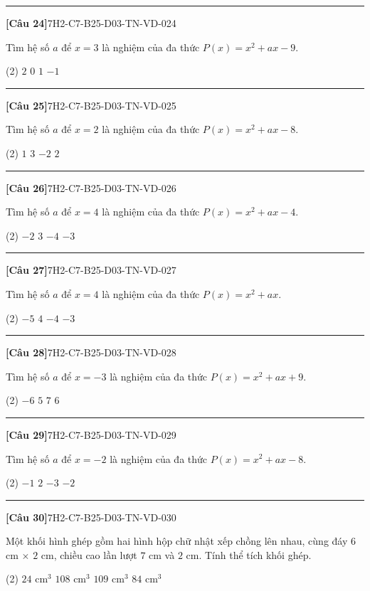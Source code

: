 \documentclass[12pt,a4paper]{article}
\newif\ifloigiai
\newenvironment{cauhoi}[2]{%
  \par\medskip\noindent\rule{\textwidth}{0.4pt}\par\nopagebreak
  \noindent\textbf{[#1]}\hfill{\scriptsize\ttfamily #2}\par\nopagebreak\smallskip}{\par}
\newcommand{\dapan}[1]{\ifloigiai\par\smallskip\noindent\textit{Đáp án:} \textbf{#1}\par\fi}
\begin{document}
\begin{cauhoi}{Câu 24}{7H2-C7-B25-D03-TN-VD-024}
Tìm hệ số $a$ để $x=3$ là nghiệm của đa thức $P(x)=x^{2}+ax-9$.
\begin{tasks}(2)
\task $2$
\task $0$
\task $1$
\task $-1$
\end{tasks}
\dapan{B}
\end{cauhoi}
\begin{cauhoi}{Câu 25}{7H2-C7-B25-D03-TN-VD-025}
Tìm hệ số $a$ để $x=2$ là nghiệm của đa thức $P(x)=x^{2}+ax-8$.
\begin{tasks}(2)
\task $1$
\task $3$
\task $-2$
\task $2$
\end{tasks}
\dapan{D}
\end{cauhoi}
\begin{cauhoi}{Câu 26}{7H2-C7-B25-D03-TN-VD-026}
Tìm hệ số $a$ để $x=4$ là nghiệm của đa thức $P(x)=x^{2}+ax-4$.
\begin{tasks}(2)
\task $-2$
\task $3$
\task $-4$
\task $-3$
\end{tasks}
\dapan{D}
\end{cauhoi}
\begin{cauhoi}{Câu 27}{7H2-C7-B25-D03-TN-VD-027}
Tìm hệ số $a$ để $x=4$ là nghiệm của đa thức $P(x)=x^{2}+ax$.
\begin{tasks}(2)
\task $-5$
\task $4$
\task $-4$
\task $-3$
\end{tasks}
\dapan{C}
\end{cauhoi}
\begin{cauhoi}{Câu 28}{7H2-C7-B25-D03-TN-VD-028}
Tìm hệ số $a$ để $x=-3$ là nghiệm của đa thức $P(x)=x^{2}+ax+9$.
\begin{tasks}(2)
\task $-6$
\task $5$
\task $7$
\task $6$
\end{tasks}
\dapan{D}
\end{cauhoi}
\begin{cauhoi}{Câu 29}{7H2-C7-B25-D03-TN-VD-029}
Tìm hệ số $a$ để $x=-2$ là nghiệm của đa thức $P(x)=x^{2}+ax-8$.
\begin{tasks}(2)
\task $-1$
\task $2$
\task $-3$
\task $-2$
\end{tasks}
\dapan{D}
\end{cauhoi}
\begin{cauhoi}{Câu 30}{7H2-C7-B25-D03-TN-VD-030}
Một khối hình ghép gồm hai hình hộp chữ nhật xếp chồng lên nhau, cùng đáy $6$ cm $\times$ $2$ cm, chiều cao lần lượt $7$ cm và $2$ cm. Tính thể tích khối ghép.
\begin{tasks}(2)
\task $24\text{ cm}^3$
\task $108\text{ cm}^3$
\task $109\text{ cm}^3$
\task $84\text{ cm}^3$
\end{tasks}
\dapan{B}
\end{cauhoi}
\end{document}
